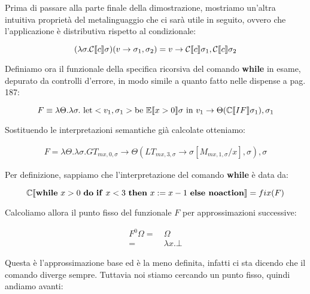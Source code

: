     Prima di passare alla parte finale della dimostrazione, mostriamo un'altra intuitiva proprietà del metalinguaggio che ci sarà utile in seguito, ovvero che l'applicazione è distributiva rispetto al condizionale:
    
    \begin{equation*}
        (\lambda \sigma. \mathcal{C}\llbracket c \rrbracket\sigma)(v \rightarrow \sigma_1, \sigma_2) = v \rightarrow \mathcal{C}\llbracket c \rrbracket\sigma_1, \mathcal{C}\llbracket c \rrbracket\sigma_2
    \end{equation*}
    
    Definiamo ora il funzionale della specifica ricorsiva del comando \textbf{while} in esame, depurato da controlli d'errore, in modo simile a quanto fatto nelle dispense a pag. 187:
    
    \begin{equation*}
        F \equiv \lambda\Theta.\lambda\sigma.\ \mbox{let} <v_1,\sigma_1> \mbox{be}\ \mathbb{E}\doublebracket{x>0}\sigma\ \mbox{in}\ v_1 \rightarrow \Theta(\mathbb{C}\doublebracket{IF}\sigma_1), \sigma_1
    \end{equation*}
    
    Sostituendo le interpretazioni semantiche già calcolate otteniamo:
    
    \begin{align*}
        F = \lambda\Theta.\lambda\sigma. GT_{mx,0,\sigma} \rightarrow \Theta(LT_{mx,3,\sigma}\rightarrow \sigma[M_{mx,1,\sigma}/x], \sigma), \sigma
    \end{align*}
    
    Per definizione, sappiamo che l'interpretazione del comando \textbf{while} è data da:
    
    \begin{equation*}
        \mathbb{C}\doublebracket{\mbox{\textbf{while}}\ x>0\ \mbox{\textbf{do}}\ \mbox{\textbf{if}}\ x<3\ \mbox{\textbf{then}}\ x:=x-1\ \mbox{\textbf{else noaction}}} = fix(F)
    \end{equation*}
    
    Calcoliamo allora il punto fisso del funzionale $F$ per approssimazioni successive:
    
    \begin{align*}
        F^0\Omega =\ & \Omega\\
        =\ & \lambda x.\bot
    \end{align*}
    
    Questa è l'approssimazione base ed è la meno definita, infatti ci sta dicendo che il comando diverge sempre. Tuttavia noi stiamo cercando un punto fisso, quindi andiamo avanti:
    
